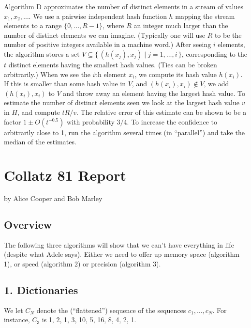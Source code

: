 \documentclass{tufte-handout}
\begin{document}
Algorithm D approximates the number of distinct elements in a stream
of values $x_1,x_2,\ldots$.
We use a pairwise independent hash function $h$ mapping the stream
elements to a range $\{0,\ldots, R-1\}$, where $R$ an integer much
larger than the number of distinct elements we can imagine.
(Typically one will use $R$ to be the number of positive integers
available in a machine word.)
After seeing $i$ elements, the algorithm stores a set $V\subseteq \{
\,(h(x_j),x_j) \mid j=1,\dots,i\,\}$, corresponding to the $t$ distinct
elements having the smallest hash values.
(Ties can be broken arbitrarily.)
When we see the $i$th element $x_i$, we compute its hash value
$h(x_i)$.
If this is smaller than some hash value in $V$, and
$(h(x_i),x_i)\not\in V$, we add $(h(x_i),x_i)$ to $V$ and throw away
an element having the largest hash value.
To estimate the number of distinct elements seen we look at the
largest hash value $v$ in $H$, and compute $tR/v$.
The relative error of this estimate can be shown to be a factor $1\pm
O(t^{-0.5})$ with probability $3/4$.
To increase the confidence to arbitrarily close to 1, run the
algorithm several times (in ``parallel'') and take the median of the
estimates.





\newpage
\section{Collatz 81 Report}


by Alice Cooper and Bob Marley

\subsection{Overview}
The following three algorithms will show that we can't have everything in life
(despite what Adele says). Either we need to offer up memory space (algorithm 1),
or speed (algorithm 2) or precision (algorithm 3).

\subsection{1. Dictionaries}

We let $C_N$ denote the (``flattened'') sequence of the sequences
$c_1,\ldots, c_N$. For instance, $C_3$ is 1, 2, 1, 3, 10, 5, 16, 8, 4,
2, 1.
\end{document}
